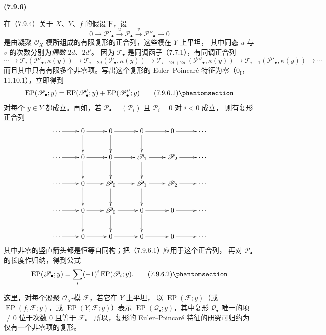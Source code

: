 \documentclass[UTF8,fontset=none,11pt,oneside,openany]{ctexbook}
\newenvironment{env}[1][]{%
  \par\medskip\noindent\textbf{(#1)}\ %
}{\par}
\newcommand{\oldpage}[2][]{%
  \hypertarget{ega-source-page-#1-#2}{}%
  \marginnote{\scriptsize\textbf{#1}~|~#2}\ignorespaces}
\let\EGAOriginalLabel\label
\renewcommand{\label}[1]{\phantomsection\EGAOriginalLabel{#1}}
\begin{document}
\begin{env}[7.9.6]
\label{III.7.9.6.fr}
在（7.9.4）关于 $X$、$Y$、$f$ 的假设下，设
\[
  0\longrightarrow\mathscr P'_\bullet
  \xrightarrow{u}\mathscr P_\bullet
  \xrightarrow{v}\mathscr P''_\bullet
  \longrightarrow0
\]
是由凝聚 $\mathscr O_X$-模所组成的有限复形的正合列，这些模在
$Y$ 上平坦，
其中同态 $u$ 与 $v$ 的次数分别为\emph{偶数} $2d$、$2d'$。
因为 $\mathscr T_\bullet$ 是同调函子（7.7.1），有同调正合列
\[
  \cdots\longrightarrow
  \mathscr T_i(\mathscr P'_\bullet,\kappa(y))
  \longrightarrow
  \mathscr T_{i+2d}(\mathscr P_\bullet,\kappa(y))
  \longrightarrow
  \mathscr T_{i+2d+2d'}(\mathscr P''_\bullet,\kappa(y))
  \longrightarrow
  \mathscr T_{i-1}(\mathscr P'_\bullet,\kappa(y))
  \longrightarrow\cdots
\]
而且其中只有有限多个非零项。写出这个复形的 Euler--Poincaré
特征为零（$0_{\mathrm I}$，11.10.1），立即得到
\[
  \operatorname{EP}(\mathscr P_\bullet;y)
  =\operatorname{EP}(\mathscr P'_\bullet;y)
  +\operatorname{EP}(\mathscr P''_\bullet;y)
  \tag{7.9.6.1}\label{III.7.9.6.1.fr}
\]
对每个 $y\in Y$ 都成立。再如，若
$\mathscr P_\bullet=(\mathscr P_i)$ 且 $\mathscr P_i=0$ 对 $i<0$ 成立，
则有复形正合列
\[
\xymatrix@C=2.4em{
  \cdots \ar[r] & 0 \ar[r]\ar[d] & 0 \ar[r]\ar[d]
    & 0 \ar[r]\ar[d] & 0 \ar[r] & \cdots \\
  \cdots \ar[r] & 0 \ar[r]\ar[d] & 0 \ar[r]\ar[d]
    & \mathscr P_1 \ar[r]\ar[d] & \mathscr P_2 \ar[r] & \cdots \\
  \cdots \ar[r] & 0 \ar[r]\ar[d] & \mathscr P_0 \ar[r]\ar[d]
    & \mathscr P_1 \ar[r]\ar[d] & \mathscr P_2 \ar[r] & \cdots \\
  \cdots \ar[r] & 0 \ar[r]\ar[d] & \mathscr P_0 \ar[r]\ar[d]
    & 0 \ar[r]\ar[d] & 0 \ar[r] & \cdots \\
  \cdots \ar[r] & 0 \ar[r] & 0 \ar[r]
    & 0 \ar[r] & 0 \ar[r] & \cdots
}
\]
其中非零的竖直箭头都是恒等自同构；把（7.9.6.1）应用于这个正合列，
再对 $\mathscr P_\bullet$ 的长度作归纳，得到公式
\[
  \operatorname{EP}(\mathscr P_\bullet;y)
  =\sum_i(-1)^i\operatorname{EP}(\mathscr P_i;y).
  \tag{7.9.6.2}\label{III.7.9.6.2.fr}
\]

\oldpage[III]{210}
这里，对每个凝聚 $\mathscr O_X$-模 $\mathscr F$，若它在 $Y$ 上平坦，
以 $\operatorname{EP}(\mathscr F;y)$（或
$\operatorname{EP}(f,\mathscr F;y)$，或
$\operatorname{EP}(Y,\mathscr F;y)$）表示
$\operatorname{EP}(\mathscr Q_\bullet;y)$，其中复形
$\mathscr Q_\bullet$ 唯一的项 $\ne0$ 位于次数 $0$ 且等于 $\mathscr F$。
所以，复形的 Euler--Poincaré 特征的研究可归约为仅有一个非零项的复形。
\end{env}
\end{document}
